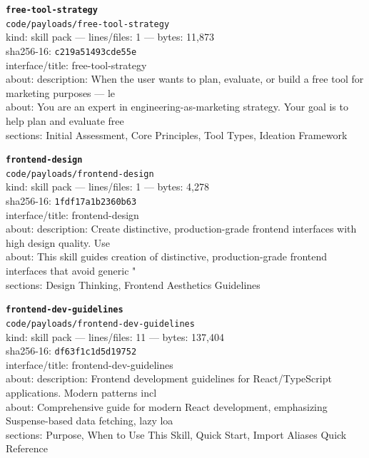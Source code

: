 \noindent\textbf{\texttt{free-tool-strategy}}\\
\texttt{code/payloads/free-tool-strategy}\\
kind: skill pack --- lines/files: 1 --- bytes: 11,873\\
sha256-16: \texttt{c219a51493cde55e}\\
interface/title: free-tool-strategy\\
about: description: When the user wants to plan, evaluate, or build a free tool for marketing purposes — le\\
about: You are an expert in engineering-as-marketing strategy. Your goal is to help plan and evaluate free \\
sections: Initial Assessment, Core Principles, Tool Types, Ideation Framework\\
\vspace*{6.0pt}
\newpage

\noindent\textbf{\texttt{frontend-design}}\\
\texttt{code/payloads/frontend-design}\\
kind: skill pack --- lines/files: 1 --- bytes: 4,278\\
sha256-16: \texttt{1fdf17a1b2360b63}\\
interface/title: frontend-design\\
about: description: Create distinctive, production-grade frontend interfaces with high design quality. Use \\
about: This skill guides creation of distinctive, production-grade frontend interfaces that avoid generic "\\
sections: Design Thinking, Frontend Aesthetics Guidelines\\
\vspace*{6.0pt}

\noindent\textbf{\texttt{frontend-dev-guidelines}}\\
\texttt{code/payloads/frontend-dev-guidelines}\\
kind: skill pack --- lines/files: 11 --- bytes: 137,404\\
sha256-16: \texttt{df63f1c1d5d19752}\\
interface/title: frontend-dev-guidelines\\
about: description: Frontend development guidelines for React/TypeScript applications. Modern patterns incl\\
about: Comprehensive guide for modern React development, emphasizing Suspense-based data fetching, lazy loa\\
sections: Purpose, When to Use This Skill, Quick Start, Import Aliases Quick Reference\\
\vspace*{6.0pt}

